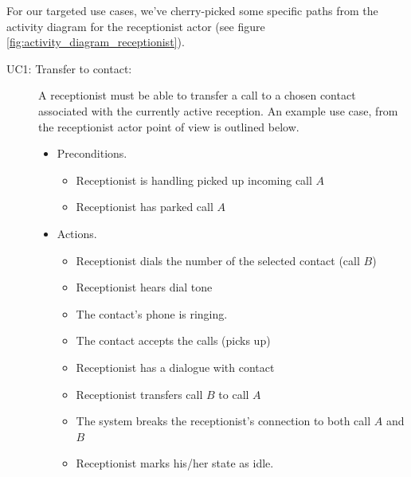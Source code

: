 For our targeted use cases, we've cherry-picked some specific paths from the activity diagram for the receptionist actor (see figure \ref{fig:activity_diagram_receptionist}).

\begin{description}
  \item[UC1: Transfer to contact:] A receptionist must be able to transfer a call to a chosen contact associated with the currently active reception. An example use case, from the receptionist actor point of view is outlined below.
  \begin{itemize}
    \item Preconditions.
    \begin{itemize}
      \item Receptionist is handling picked up incoming call $A$
      \item Receptionist has parked call $A$
    \end{itemize}
    \item Actions.
    \begin{itemize}
      \item Receptionist dials the number of the selected contact (call $B$)
      \item Receptionist hears dial tone
      \item The contact's phone is ringing.
      \item The contact accepts the calls (picks up)
      \item Receptionist has a dialogue with contact
      \item Receptionist transfers call $B$ to call $A$
      \item The system breaks the receptionist's connection to both call $A$ and $B$    
      \item Receptionist marks his/her state as idle.
    \end{itemize}
  \end{itemize}


\end{description}
